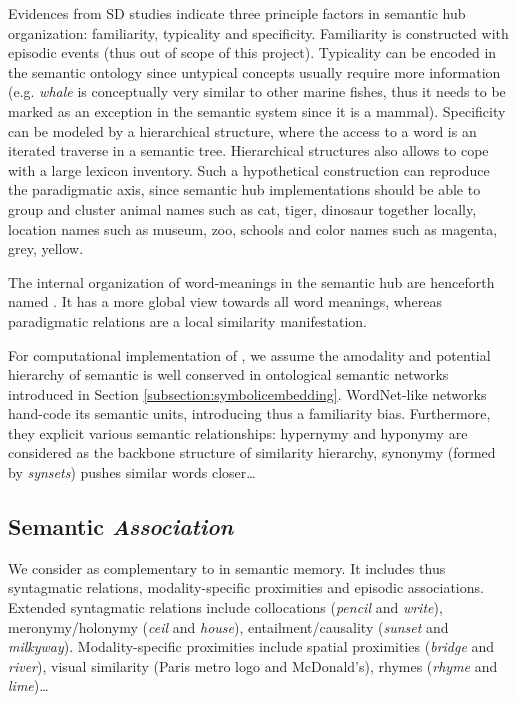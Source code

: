Evidences from SD studies indicate three principle factors in semantic hub organization: familiarity, typicality and specificity. Familiarity is constructed with episodic events (thus out of scope of this project). Typicality can be encoded in the semantic ontology since untypical concepts usually require more information (e.g. \emph{whale} is conceptually very similar to other marine fishes, thus it needs to be marked as an exception in the semantic system since it is a mammal). Specificity can be modeled by a hierarchical structure, where the access to a word is an iterated traverse in a semantic tree. Hierarchical structures also allows to cope with a large lexicon inventory. Such a hypothetical construction can reproduce the paradigmatic axis, since semantic hub implementations should be able to group and cluster animal names such as cat, tiger, dinosaur together locally, location names such as museum, zoo, schools and color names such as magenta, grey, yellow.

The internal organization of word-meanings in the semantic hub are henceforth named \similarity. It has a more global view towards all word meanings, whereas paradigmatic relations are a local similarity manifestation. 

For computational implementation of \similarity, we assume the amodality and potential hierarchy of semantic \similarity is well conserved in ontological semantic networks introduced in Section \ref{subsection:symbolicembedding}. WordNet-like networks hand-code its semantic units, introducing thus a familiarity bias. Furthermore, they explicit various semantic relationships: hypernymy and hyponymy are considered as the backbone structure of similarity hierarchy, synonymy (formed by \emph{synsets}) pushes similar words closer\dots

\subsection{Semantic \emph{Association}}

We consider \association as complementary to \similarity in semantic memory. It includes thus syntagmatic relations, modality-specific proximities and episodic associations. Extended syntagmatic relations include collocations (\emph{pencil} and \emph{write}), meronymy/holonymy (\emph{ceil} and \emph{house}), entailment/causality (\emph{sunset} and \emph{milkyway}). Modality-specific proximities include spatial proximities (\emph{bridge} and \emph{river}), visual similarity (Paris metro logo and McDonald's), rhymes (\emph{rhyme} and \emph{lime})\dots


